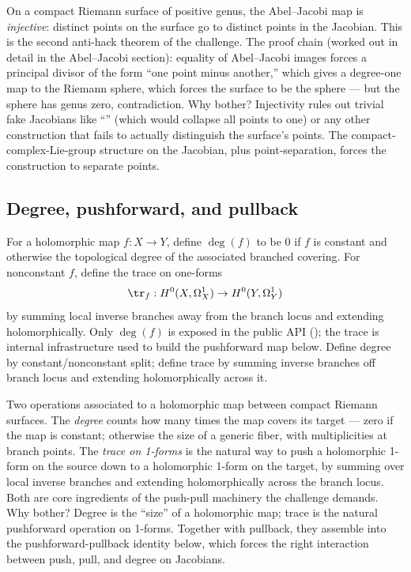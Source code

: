 \begin{layman}
On a compact Riemann surface of positive genus, the Abel--Jacobi map is
\emph{injective}: distinct points on the surface go to distinct points
in the Jacobian. This is the second anti-hack theorem of the
challenge. The proof chain (worked out in detail in the Abel--Jacobi
section):
equality of Abel--Jacobi images forces a principal divisor of the form
``one point minus another,'' which gives a degree-one map to the
Riemann sphere, which forces the surface to be the sphere --- but the
sphere has genus zero, contradiction. Why bother? Injectivity rules
out trivial fake Jacobians like ``''
(which would collapse all points to one) or any other construction
that fails to actually distinguish the surface's points. The compact-complex-Lie-group structure on the Jacobian, plus
point-separation, forces the construction to separate points.
\end{layman}

\subsection{Degree, pushforward, and pullback}

\begin{definition}
\label{def:degree-trace}
For a holomorphic map \(f:X\to Y\), define \(\deg(f)\) to be \(0\) if
\(f\) is constant and otherwise the topological degree of the associated
branched covering. For nonconstant \(f\), define the trace on one-forms
\[
  \tr_f : H^{0}(X,\Omega^{1}_{X}) \to H^{0}(Y,\Omega^{1}_{Y})
\]
by summing local inverse branches away from the branch locus and extending
holomorphically. Only \(\deg(f)\) is exposed in the public API
(); the trace is internal infrastructure used to
build the pushforward map below.
\leanok
\proofplan
Define degree by constant/nonconstant split; define trace by summing inverse
branches off branch locus and extending holomorphically across it.
\end{definition}

\begin{layman}
Two operations associated to a holomorphic map between compact Riemann
surfaces. The \emph{degree} counts how many times the map covers its
target --- zero if the map is constant; otherwise the size of a generic
fiber, with multiplicities at branch points. The \emph{trace on
1-forms} is the natural way to push a holomorphic 1-form on the source
down to a holomorphic 1-form on the target, by summing over local
inverse branches and extending holomorphically across the branch
locus. Both are core ingredients of the push-pull machinery the
challenge demands. Why bother? Degree is the ``size'' of a
holomorphic map; trace is the natural pushforward operation on
1-forms. Together with pullback, they assemble into the
pushforward-pullback identity below, which forces the right
interaction between push, pull, and degree on Jacobians.
\end{layman}

